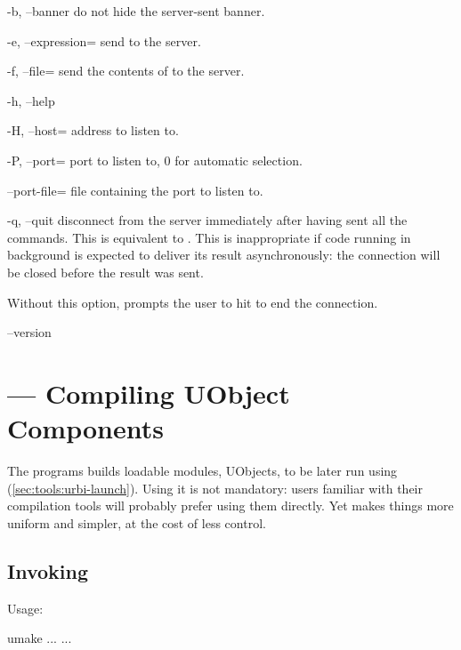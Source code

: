 \begin{options}
\item[-b, --banner] do not hide the server-sent banner.
\item[-e, --expression=\var{script}] send  to the server.
\item[-f, --file=\var{file}] send the contents of  to the
  server.
\item[-h, --help] \optionHelp
\item[-H, --host=\var{host}] address to listen to.
\item[-P, --port=\var{port}] port to listen to, 0 for automatic
  selection.
\item[--port-file=\var{file}] file containing the port to listen to.
\item[-q, --quit] disconnect from the server immediately after having
  sent all the commands.  This is equivalent to .
  This is inappropriate if code running in background is expected to
  deliver its result asynchronously: the connection will be closed
  before the result was sent.

  Without this option,  prompts the user to hit
   to end the connection.
\item[--version] \optionVersion
\end{options}


\section{ --- Compiling UObject Components}
\label{sec:tools:umake}

The  programs builds loadable modules, UObjects, to be
later run using 
(\autoref{sec:tools:urbi-launch}).  Using it is not mandatory: users
familiar with their compilation tools will probably prefer using them
directly.  Yet  makes things more uniform and simpler,
at the cost of less control.

\subsection{Invoking }
\label{sec:tools:umake:invoke}

Usage:
\begin{shell}
umake ... ...
\end{shell}


